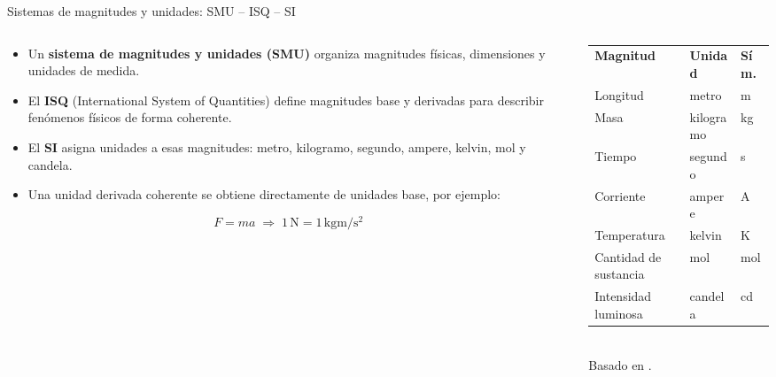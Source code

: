 \documentclass[aspectratio=169]{beamer}
\begin{document}
\begin{frame}{Sistemas de magnitudes y unidades: SMU -- ISQ -- SI}
    \begin{columns}[c, onlytextwidth]
        \begin{column}{0.65\textwidth}
            \begin{itemize}
                \item Un \textbf{sistema de magnitudes y unidades (SMU)} organiza magnitudes físicas, dimensiones y unidades de medida.
                \item El \textbf{ISQ} (International System of Quantities) define magnitudes base y derivadas para describir fenómenos físicos de forma coherente.
                \item El \textbf{SI} asigna unidades a esas magnitudes: metro, kilogramo, segundo, ampere, kelvin, mol y candela.
                \item Una unidad derivada coherente se obtiene directamente de unidades base, por ejemplo:
            \end{itemize}
            \[
                F = m a
                \;\Rightarrow\;
                1\,\si{\newton} = 1\,\si{\kilogram\meter\per\second\squared}
            \]
        \end{column}
        \begin{column}{0.50\textwidth}
            \small
            \begin{tabular}{lll}
                \textbf{Magnitud} & \textbf{Unidad} & \textbf{Sím.} \\
                Longitud & metro & m \\
                Masa & kilogramo & kg \\
                Tiempo & segundo & s \\
                Corriente & ampere & A \\
                Temperatura & kelvin & K \\
                Cantidad de sustancia & mol & mol \\
                Intensidad luminosa & candela & cd \\
            \end{tabular}\\[8pt]
            \tiny{Basado en \cite{isq_iso80000_1,bipm_si_2019}.}
        \end{column}
    \end{columns}
\end{frame}
\end{document}
